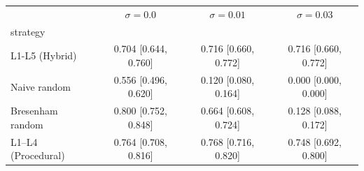 \begin{tabular}{lccc}
\toprule
 & $\sigma=0.0$ & $\sigma=0.01$ & $\sigma=0.03$ \\
strategy &  &  &  \\
\midrule
L1-L5 (Hybrid) & 0.704 [0.644, 0.760] & 0.716 [0.660, 0.772] & 0.716 [0.660, 0.772] \\
Naive random & 0.556 [0.496, 0.620] & 0.120 [0.080, 0.164] & 0.000 [0.000, 0.000] \\
Bresenham random & 0.800 [0.752, 0.848] & 0.664 [0.608, 0.724] & 0.128 [0.088, 0.172] \\
L1–L4 (Procedural) & 0.764 [0.708, 0.816] & 0.768 [0.716, 0.820] & 0.748 [0.692, 0.800] \\
\bottomrule
\end{tabular}

